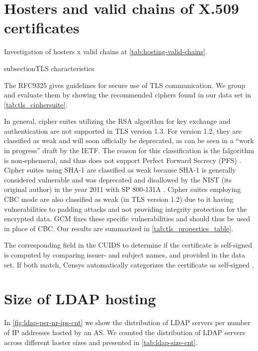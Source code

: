 \section{Hosters and valid chains of X.509 certificates}

Investigation of hosters x valid chains at \cref{tab:hosting-valid-chains}.







\iffalse
subsection{TLS characteristics}

The RFC9325 gives guidelines for secure use of \gls{TLS} communication. We group and evaluate them by showing the recommended ciphers found in our data set in \cref{tab:tls_ciphersuite}. 


In general, cipher suites utilizing the \gls{RSA} algorithm for key exchange and authentication are not supported in TLS version 1.3. For version 1.2, they are classified as weak and will soon officially be deprecated, as can be seen in a ``work in progress'' draft by the \gls{IETF}. The reason for this classification is the  falgorithm is non-ephemeral, and thus does not support Perfect Forward Secrecy (PFS) \cite{ietf-tls-deprecate-obsolete-kex-03}. Cipher suites using \gls{SHA-1} are classified as weak because \gls{SHA-1} is generally considered vulnerable and was deprecated and disallowed by the \gls{NIST} (its original author) in the year 2011 with SP 800-131A \cite{BarkerRoginsky_TransitioningUseCryptographic_2019}. Cipher suites employing \gls{CBC} mode \cite{fardan2013} are also classified as weak (in \gls{TLS} version 1.2) due to it having vulnerabilities to padding attacks and not providing integrity protection for the encrypted data. \gls{GCM} fixes these specific vulnerabilities and should thus be used in place of \gls{CBC}. Our results are summarized in \cref{tab:tls_properties_table}.

The corresponding field in the \gls{CUIDS} to determine if the certificate is self-signed is computed by comparing issuer- and subject names, and provided in the data set. If both match, Censys automatically categorizes the certificate as self-signed \cite{rfc5280}.


\section{Size of LDAP hosting}
\label{sec:appendix_host_size}
In \cref{fig:ldap-per-nr-ips-cnt} we show the distribution of \gls{LDAP} servers per number of IP addresses hosted by an AS. We counted the distribution of \gls{LDAP} servers across different hoster sizes and presented in \cref{tab:ldap-size-cnt}. 

